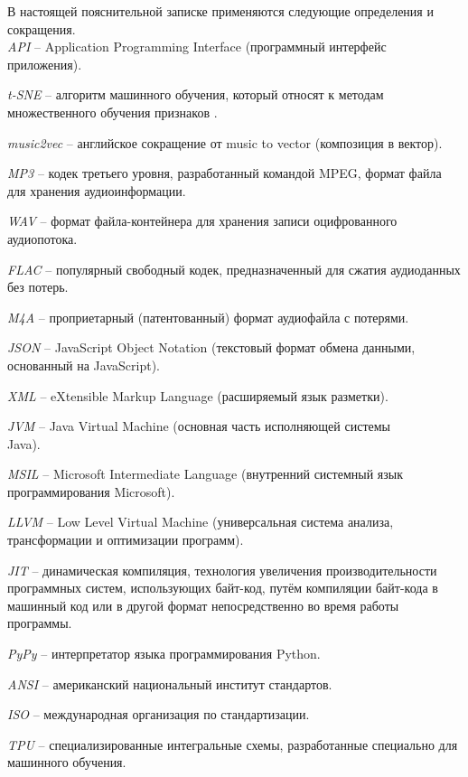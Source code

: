 \label{sec:definitions}

В настоящей пояснительной записке применяются следующие определения и сокращения.
\\

\emph{API} -- Application Programming Interface (программный интерфейс приложения).

\emph{t-SNE} -- алгоритм машинного обучения, который относят к методам множественного обучения признаков \cite{tsne}.

\emph{music2vec} -- английское сокращение от music to vector (композиция в вектор).

\emph{MP3} -- кодек третьего уровня, разработанный командой MPEG, формат файла для хранения аудиоинформации.

\emph{WAV} -- формат файла-контейнера для хранения записи оцифрованного аудиопотока.

\emph{FLAC} -- популярный свободный кодек, предназначенный для сжатия аудиоданных без потерь.

\emph{M4A} -- проприетарный (патентованный) формат аудиофайла с потерями.

\emph{JSON} -- JavaScript Object Notation (текстовый формат обмена данными, основанный на JavaScript).

\emph{XML} -- eXtensible Markup Language (расширяемый язык разметки).

\emph{JVM} -- Java Virtual Machine (основная часть исполняющей системы \\Java).

\emph{MSIL} -- Microsoft Intermediate Language (внутренний системный язык программирования Microsoft).

\emph{LLVM} -- Low Level Virtual Machine (универсальная система анализа, трансформации и оптимизации программ).

\emph{JIT} -- динамическая компиляция, технология увеличения производительности программных систем, использующих байт-код, путём компиляции байт-кода в машинный код или в другой формат непосредственно во время работы программы.

\emph{PyPy} -- интерпретатор языка программирования Python.

\emph{ANSI} -- американский национальный институт стандартов.

\emph{ISO} -- международная организация по стандартизации.

\emph{TPU} -- специализированные интегральные схемы, разработанные специально для машинного обучения.

